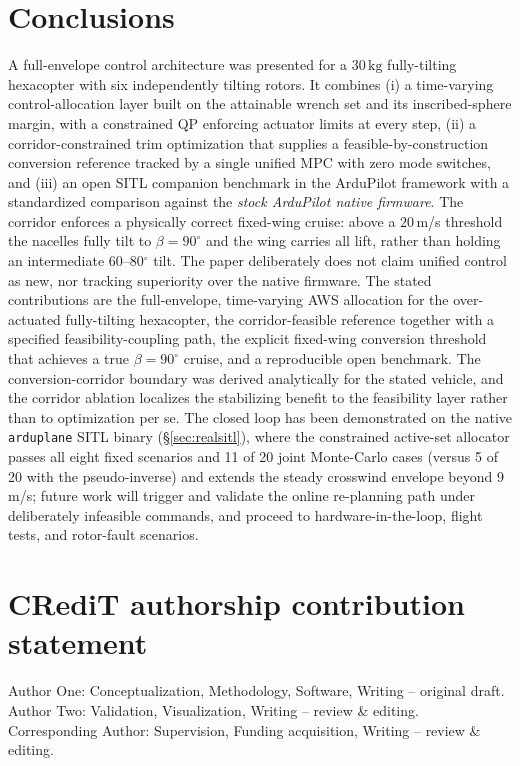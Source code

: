 \documentclass[preprint,3p,11pt]{elsarticle}
\newcommand{\SI}[2]{\ensuremath{#1\,#2}}
\newcommand{\kilogram}{\mathrm{kg}}
\begin{document}
\section{Conclusions}\label{sec:conclusion}
A full-envelope control architecture was presented for a \SI{30}{\kilogram}
fully-tilting hexacopter with six independently tilting rotors. It combines
(i) a time-varying control-allocation layer built on the attainable wrench set
and its inscribed-sphere margin, with a constrained QP enforcing actuator
limits at every step, (ii) a corridor-constrained trim optimization that
supplies a feasible-by-construction conversion reference tracked by a single
unified MPC with zero mode switches, and (iii) an open SITL companion benchmark
in the ArduPilot framework with a standardized comparison against the
\emph{stock ArduPilot native firmware}. The corridor enforces a physically
correct fixed-wing cruise: above a $20$\,m/s threshold the nacelles fully
tilt to $\beta=90^\circ$ and the wing carries all lift, rather than holding
an intermediate 60--80$^\circ$ tilt. The paper deliberately does not claim
unified control as new, nor tracking superiority over the native firmware.
The stated
contributions are the full-envelope, time-varying AWS allocation for the
over-actuated fully-tilting hexacopter, the corridor-feasible reference together
with a specified feasibility-coupling path, the explicit fixed-wing conversion
threshold that achieves a true $\beta=90^\circ$ cruise, and a reproducible
open benchmark. The conversion-corridor boundary was derived analytically for the stated
vehicle, and the corridor ablation localizes the stabilizing benefit to the
feasibility layer rather than to optimization per se. The closed loop has been
demonstrated on the native \texttt{arduplane} SITL binary (\S\ref{sec:realsitl}),
where the constrained active-set allocator passes all eight fixed scenarios and
11 of 20 joint Monte-Carlo cases (versus 5 of 20 with the pseudo-inverse) and
extends the steady crosswind envelope beyond 9\,m/s;
future work will trigger and validate the online re-planning path under
deliberately infeasible commands, and proceed to
hardware-in-the-loop, flight tests, and rotor-fault scenarios.

\section*{CRediT authorship contribution statement}
Author One: Conceptualization, Methodology, Software, Writing -- original draft.
Author Two: Validation, Visualization, Writing -- review \& editing.
Corresponding Author: Supervision, Funding acquisition, Writing -- review \& editing.
\end{document}
